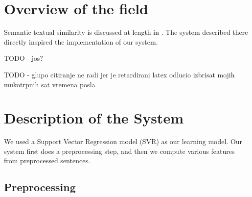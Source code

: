 \documentclass[10pt, a4paper]{article}
\begin{document}

\section{Overview of the field}


Semantic textual similarity is discussed at length in \citep{vsaric2012takelab}. The system described there directly inspired the implementation of our system.

TODO - jos?

TODO - glupo citiranje ne radi jer je retardirani latex odlucio izbrisat mojih mukotrpnih sat vremena posla


\section{Description of the System}

We used a Support Vector Regression model (SVR) as our learning model. Our system first does a preprocessing step, and then we compute various features from preprocessed sentences.

\subsection{Preprocessing}
\label{sec:first}
\end{document}

